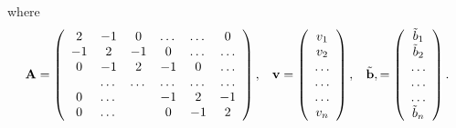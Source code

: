 \documentclass[11pt,a4paper,twoside,reqno]{amsart}
\begin{document}
where 
\begin{equation*}
    {\bf A} = \left(\begin{array}{cccccc}
                           2& -1& 0 &\dots   & \dots &0 \\
                           -1 & 2 & -1 &0 &\dots &\dots \\
                           0&-1 &2 & -1 & 0 & \dots \\
                           & \dots   & \dots &\dots   &\dots & \dots \\
                           0&\dots   &  &-1 &2& -1 \\
                           0&\dots    &  & 0  &-1 & 2 \\
                      \end{array} \right),\hspace{0.3cm} {\bf v}= \left(\begin{array}{c}
                           v_1\\
                           v_2\\
                           \dots \\
                          \dots  \\
                          \dots \\
                           v_n\\
                      \end{array} \right)
  ,\hspace{0.3cm} \tilde{{\bf b}}, = \left(\begin{array}{c}
                           \tilde{b}_1\\
                           \tilde{b}_2\\
                           \dots \\
                           \dots \\
                          \dots \\
                           \tilde{b}_n\\
                      \end{array} \right).
\end{equation*}
\end{document}
